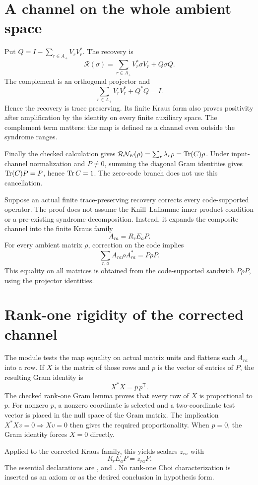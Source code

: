 \documentclass[10pt,letterpaper]{article}
\newcommand{\pageheading}[2]{\vspace*{2pt}{\small\color{ink}\textsc{#1}}\par\vspace{2pt}{\Large\bfseries #2}\par\vspace{4pt}}
\begin{document}
\section*{A channel on the whole ambient space}
Put $Q=I-\sum_{r\in A_+}V_rV_r^*$. The recovery is
\[
\boxed{\mathcal R(\sigma)=\sum_{r\in A_+}V_r^*\sigma V_r+Q\sigma Q.}
\]
The complement is an orthogonal projector and
\[
\sum_{r\in A_+}V_rV_r^*+Q^*Q=I.
\]
Hence the recovery is trace preserving. Its finite Kraus form also proves positivity after amplification by the identity on every finite auxiliary space. The complement term matters: the map is defined as a channel even outside the syndrome ranges.

Finally the checked calculation gives $\mathcal R\mathcal N_E(\rho)=\sum_r\lambda_r\rho=\operatorname{Tr}(C)\rho$. Under input-channel normalization and $P\ne0$, summing the diagonal Gram identities gives $\operatorname{Tr}(C)P=P$, hence $\operatorname{Tr} C=1$. The zero-code branch does not use this cancellation.

\newpage
\pageheading{Necessity}{Deriving the Gram matrix from recovery}
Suppose an actual finite trace-preserving recovery corrects every code-supported operator. The proof does not assume the Knill--Laflamme inner-product condition or a pre-existing syndrome decomposition. Instead, it expands the composite channel into the finite Kraus family
\[
A_{ra}=R_rE_aP.
\]
For every ambient matrix $\rho$, correction on the code implies
\[
\sum_{r,a} A_{ra}\rho A_{ra}^*=P\rho P.
\]
This equality on all matrices is obtained from the code-supported sandwich $P\rho P$, using the projector identities.

\section*{Rank-one rigidity of the corrected channel}
The module tests the map equality on actual matrix units and flattens each $A_{ra}$ into a row. If $X$ is the matrix of those rows and $p$ is the vector of entries of $P$, the resulting Gram identity is
\[
X^*X=\overline p\,p^{\mathsf T}.
\]
The checked rank-one Gram lemma proves that every row of $X$ is proportional to $p$. For nonzero $p$, a nonzero coordinate is selected and a two-coordinate test vector is placed in the null space of the Gram matrix. The implication $X^*Xv=0\Rightarrow Xv=0$ then gives the required proportionality. When $p=0$, the Gram identity forces $X=0$ directly.

Applied to the corrected Kraus family, this yields scalars $z_{ra}$ with
\[
R_rE_aP=z_{ra}P.
\]
The essential declarations are ,  and . No rank-one Choi characterization is inserted as an axiom or as the desired conclusion in hypothesis form.
\end{document}
